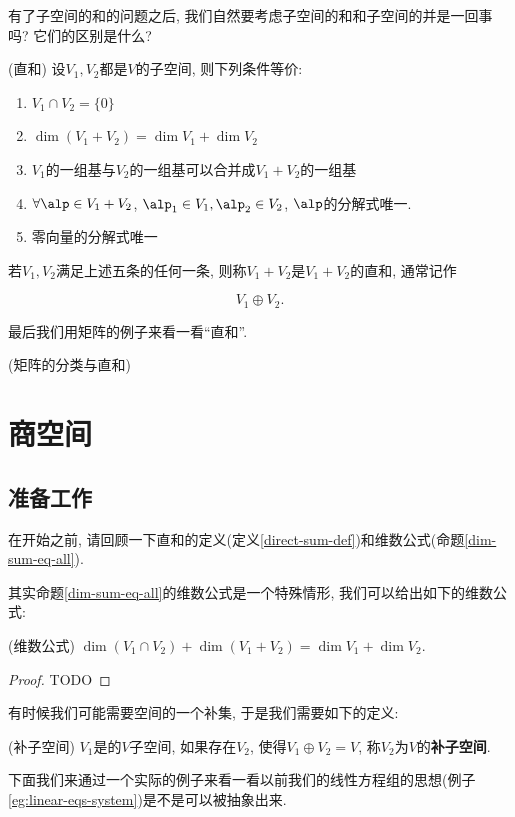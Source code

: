 有了子空间的和的问题之后, 我们自然要考虑子空间的和和子空间的并是一回事吗? 它们的区别是什么? 
\begin{defn}
\label{direct-sum-def}(直和) 设$V_{1},V_{2}$都是$V$的子空间, 则下列条件等价:
\begin{enumerate}
\item $V_{1}\cap V_{2}=\{0\}$
\item $\dim(V_{1}+V_{2})=\dim V_{1}+\dim V_{2}$
\item $V_{1}$的一组基与$V_{2}$的一组基可以合并成$V_{1}+V_{2}$的一组基
\item $\forall\alp\in V_{1}+V_{2}$, $\alp_{1}\in V_{1},\alp_{2}\in V_{2}$,
$\alp$的分解式唯一. 
\item 零向量的分解式唯一
\end{enumerate}
若$V_{1},V_{2}$满足上述五条的任何一条, 则称$V_{1}+V_{2}$是$V_{1}+V_{2}$的直和, 通常记作

\[
V_{1}\oplus V_{2}.
\]
\end{defn}
最后我们用矩阵的例子来看一看``直和''.
\begin{example}
(矩阵的分类与直和)
\end{example}

\section{商空间}

\subsection{准备工作\label{subsec:quotient-ready}}

在开始之前, 请回顾一下直和的定义(定义\ref{direct-sum-def})和维数公式(命题\ref{dim-sum-eq-all}). 

其实命题\ref{dim-sum-eq-all}的维数公式是一个特殊情形, 我们可以给出如下的维数公式:
\begin{thm}
(维数公式) $\dim(V_{1}\cap V_{2})+\dim(V_{1}+V_{2})=\dim V_{1}+\dim V_{2}$.
\end{thm}
\begin{proof}
TODO
\end{proof}
有时候我们可能需要空间的一个补集, 于是我们需要如下的定义: 
\begin{defn}
(补子空间) $V_{1}$是的$V$子空间, 如果存在$V_{2}$, 使得$V_{1}\oplus V_{2}=V$,
称$V_{2}$为$V$的\textbf{补子空间}.
\end{defn}
下面我们来通过一个实际的例子来看一看以前我们的线性方程组的思想(例子\ref{eg:linear-eqs-system})是不是可以被抽象出来. 

